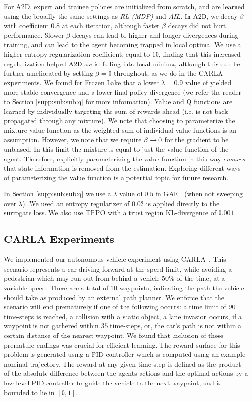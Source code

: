 For A2D, expert and trainee policies are initialized from scratch, and are learned using the broadly the same settings as \emph{RL (MDP)} and \emph{AIL}.  In A2D, we decay $\beta$ with coefficient $0.8$ at each iteration, although faster $\beta$ decays did not hurt performance.  Slower $\beta$ decays can lead to higher and longer divergences during training, and can lead to the agent becoming trapped in local optima.  We use a higher entropy regularization coefficient, equal to $10$, finding that this increased regularization helped A2D avoid falling into local minima, although this can be further ameliorated by setting $\beta = 0$ throughout, as we do in the CARLA experiments.  We found for Frozen Lake that a lower $\lambda = 0.9$ value of yielded more stable convergence and a lower final policy divergence (we refer the reader to Section \ref{supp:sub:sub:q} for more information).  Value and Q functions are learned by individually targeting the sum of rewards ahead (i.e. is not back-propagated through any mixture).  We note that choosing to parameterize the mixture value function as the weighted sum of individual value functions is an assumption.  However, we note that we require $\beta \rightarrow 0$ for the gradient to be unbiased.  In this limit the mixture is equal to just the value function of the agent.  Therefore, explicitly parameterizing the value function in this way \emph{ensures} that state information is removed from the estimation.  Exploring different ways of parameterizing the value function is a potential topic for future research.

In Section \ref{supp:sub:sub:q} we use a $\lambda$ value of $0.5$ in GAE~\citep{schulman2015high} (when not sweeping over $\lambda$).  We used an entropy regularizer of $0.02$ is applied directly to the surrogate loss.  We also use TRPO with a trust region KL-divergence of $0.001$. 


\subsection{CARLA Experiments}
We implemented our autonomous vehicle experiment using CARLA~\citep{Dosovitskiy17}. This scenario represents a car driving forward at the speed limit, while avoiding a pedestrian which may run out from behind a vehicle $50\%$ of the time, at a variable speed.  There are a total of $10$ waypoints, indicating the path the vehicle should take as produced by an external path planner.  We enforce that the scenario will end prematurely if one of the following occurs: a time limit of $90$ time-steps is reached, a collision with a static object, a lane invasion occurs, if a waypoint is not gathered within $35$ time-steps, or, the car's path is not within a certain distance of the nearest waypoint.  We found that inclusion of these premature endings was crucial for efficient learning.  The reward surface for this problem is generated using a PID controller which is computed using an example nominal trajectory.  The reward at any given time-step is defined as the product of the absolute difference between the agents actions and the optimal actions by a low-level PID controller to guide the vehicle to the next waypoint, and is bounded to lie in $[0,1]$.  

